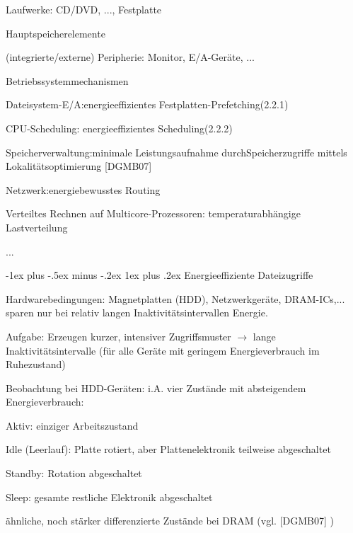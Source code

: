 \documentclass[a4paper]{article}
\makeatletter
\renewcommand{\subsubsection}{\@startsection{subsubsection}{3}{0mm}%
 {-1ex plus -.5ex minus -.2ex}%
 {1ex plus .2ex}%
 {\normalfont\small\bfseries}}
\makeatother
\begin{document}
\begin{multicols}{3}
    \begin{enumerate*}
        \item
        Laufwerke: CD/DVD, ..., Festplatte
        \item
        Hauptspeicherelemente
        \item
        (integrierte/externe) Peripherie: Monitor, E/A-Geräte, ...
    \end{enumerate*}

    Betriebssystemmechanismen

    \begin{enumerate*}
        \item
        Dateisystem-E/A:energieeffizientes Festplatten-Prefetching(2.2.1)
        \item
        CPU-Scheduling: energieeffizientes Scheduling(2.2.2)
        \item
        Speicherverwaltung:minimale Leistungsaufnahme durchSpeicherzugriffe
        mittels Lokalitätsoptimierung {[}DGMB07{]}
        \item
        Netzwerk:energiebewusstes Routing
        \item
        Verteiltes Rechnen auf Multicore-Prozessoren: temperaturabhängige
        Lastverteilung
        \item
        ...
    \end{enumerate*}


    \subsubsection{Energieeffiziente
        Dateizugriffe}

    Hardwarebedingungen: Magnetplatten (HDD), Netzwerkgeräte, DRAM-ICs,...
    sparen nur bei relativ langen Inaktivitätsintervallen Energie.

    \begin{itemize*}
        \item
        Aufgabe: Erzeugen kurzer, intensiver Zugriffsmuster
        $\rightarrow$ lange Inaktivitätsintervalle (für alle
        Geräte mit geringem Energieverbrauch im Ruhezustand)
        \item
        Beobachtung bei HDD-Geräten: i.A. vier Zustände mit absteigendem
        Energieverbrauch:
        \begin{enumerate*}

            \item Aktiv: einziger Arbeitszustand
            \item Idle (Leerlauf): Platte rotiert, aber Plattenelektronik teilweise abgeschaltet
            \item Standby: Rotation abgeschaltet
            \item Sleep: gesamte restliche Elektronik abgeschaltet
        \end{enumerate*}
        \item
        ähnliche, noch stärker differenzierte Zustände bei DRAM (vgl.
        {[}DGMB07{]} )
    \end{itemize*}


\end{multicols}
\end{document}
